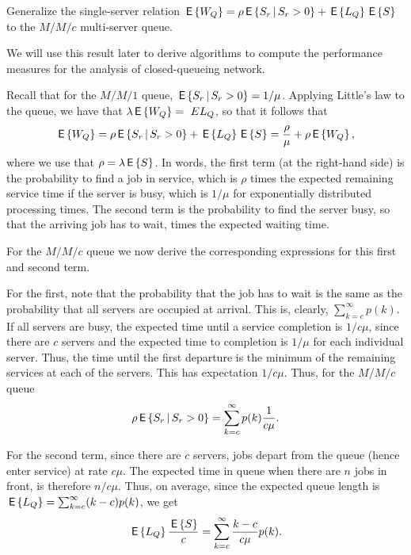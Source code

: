 \begin{question}
  Generalize the single-server relation
  $\,\mathsf{E}\left\{W_Q\right\} = \rho \,\mathsf{E}\left\{S_r\,\middle|\, S_r>0\right\} + \,\mathsf{E}\left\{L_Q\right\} \,\mathsf{E}\left\{S\right\}$ to the $M/M/c$
  multi-server queue. 

We will use this result later to derive algorithms to compute the
performance measures for the analysis of closed-queueing network.

  \begin{solution}

    Recall that for the $M/M/1$ queue, $\,\mathsf{E}\left\{S_r\,\middle|\, S_r>0\right\} = 1/\mu$.
    Applying Little's law to the queue, we have that
    $\lambda \,\mathsf{E}\left\{W_Q\right\} =\ E{L_Q}$, so that it follows that
    \begin{equation*}
    \,\mathsf{E}\left\{W_Q\right\} = \rho \,\mathsf{E}\left\{S_r \,\middle|\, S_r > 0\right\} + \,\mathsf{E}\left\{L_Q\right\}\,\mathsf{E}\left\{S\right\} = \frac{\rho}\mu + \rho \,\mathsf{E}\left\{W_Q\right\},
    \end{equation*}
    where we use that $\rho=\lambda \,\mathsf{E}\left\{S\right\}$. In words, the first term
    (at the right-hand side) is the probability to find a job in
    service, which is $\rho$ times the expected remaining service
    time if the server is busy, which is $1/\mu$ for exponentially
    distributed processing times. The second term is the probability
    to find the server busy, so that the arriving job has to wait,
    times the expected waiting time. 

    For the $M/M/c$ queue we now derive the corresponding expressions
    for this first and second term.

    For the first, note that the probability that the job has to wait
    is the same as the probability that all servers are occupied at
    arrival. This is, clearly, $\sum_{k=c}^\infty p(k)$. If all
    servers are busy, the expected time until a service completion is
    $1/c\mu$, since there are $c$ servers and the expected time to
    completion is $1/\mu$ for each individual server. Thus, the time
    until the first departure is the minimum of the remaining services
    at each of the servers. This has expectation $1/c\mu$. Thus, for the
    $M/M/c$ queue
    \begin{equation*}
\rho\,\mathsf{E}\left\{S_r\,\middle|\, S_r>0\right\}  = \sum_{k=c}^\infty p(k) \frac 1{c\mu}.
    \end{equation*}


    For the second term, since there are $c$ servers, jobs depart from
    the queue (hence enter service) at rate $c\mu$. The expected time
    in queue when there are $n$ jobs in front, is therefore
    $n/c\mu$. Thus, on average, since the expected queue length is $\,\mathsf{E}\left\{L_Q\right\}=\sum_{k=c}^\infty (k-c)p(k)$, we 
get 
\begin{equation*}
  \,\mathsf{E}\left\{L_Q\right\}\frac{\,\mathsf{E}\left\{S\right\}}c = \sum_{k=c}^\infty \frac{k-c}{c\mu}p(k).
\end{equation*}


\end{solution}
\end{question}
